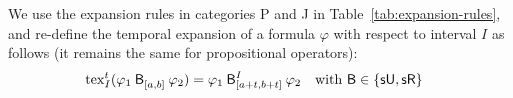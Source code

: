 \documentclass[acmsmall,screen]{acmart}
\begin{document}
We use the expansion rules in categories P and J in Table~\ref{tab:expansion-rules},
and re-define the temporal expansion of a formula $\varphi$ with respect to interval $I$ as follows (it remains the same for propositional operators):
\begin{align*}
&\exp^t_I(\anybinop{[a,b]}{\varphi_1}{\varphi_2}) = \anybinop[I]{[a+t,b+t]}{\varphi_1}{\varphi_2} && \text{with } \mathsf{B} \in \set{\suntilop, \sreleaseop}
\end{align*}
\end{document}
